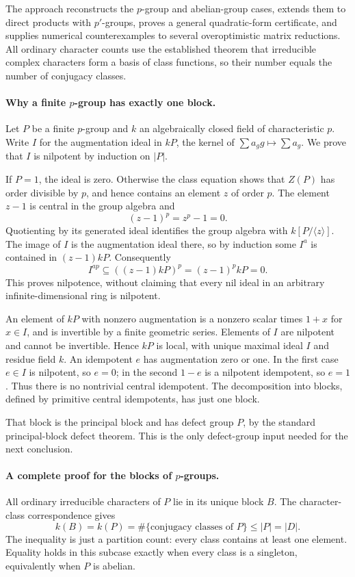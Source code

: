 \documentclass[11pt]{article}
\begin{document}
The approach reconstructs the $p$-group and abelian-group cases,
extends them to direct products with $p'$-groups, proves a general
quadratic-form certificate, and supplies numerical counterexamples to
several overoptimistic matrix reductions. All ordinary character counts
use the established theorem that irreducible complex characters form
a basis of class functions, so their number equals the number of
conjugacy classes.

\paragraph{Why a finite $p$-group has exactly one block.}
Let $P$ be a finite $p$-group and $k$ an algebraically closed field of
characteristic $p$. Write $I$ for the augmentation ideal in $kP$,
the kernel of $\sum a_g g\mapsto\sum a_g$. We prove that $I$ is
nilpotent by induction on $|P|$.

If $P=1$, the ideal is zero. Otherwise the class equation shows that
$Z(P)$ has order divisible by $p$, and hence contains an element $z$
of order $p$. The element $z-1$ is central in the group algebra and
\[
 (z-1)^p=z^p-1=0.
\]
Quotienting by its generated ideal identifies the group algebra with
$k[P/\langle z\rangle]$. The image of $I$ is the augmentation ideal
there, so by induction some $I^a$ is contained in $(z-1)kP$.
Consequently
\[
 I^{ap}\subseteq((z-1)kP)^p=(z-1)^p kP=0.
\]
This proves nilpotence, without claiming that every nil ideal in an
arbitrary infinite-dimensional ring is nilpotent.

An element of $kP$ with nonzero augmentation is a nonzero scalar times
$1+x$ for $x\in I$, and is invertible by a finite geometric series.
Elements of $I$ are nilpotent and cannot be invertible. Hence $kP$ is
local, with unique maximal ideal $I$ and residue field $k$.
An idempotent $e$ has augmentation zero or one. In the first case
$e\in I$ is nilpotent, so $e=0$; in the second $1-e$ is a nilpotent
idempotent, so $e=1$. Thus there is no nontrivial central idempotent.
The decomposition into blocks, defined by primitive central idempotents,
has just one block.

That block is the principal block and has defect group $P$, by the
standard principal-block defect theorem. This is the only defect-group
input needed for the next conclusion.

\paragraph{A complete proof for the blocks of $p$-groups.}
All ordinary irreducible characters of $P$ lie in its unique block $B$.
The character-class correspondence gives
\[
 k(B)=k(P)=\#\{\text{conjugacy classes of }P\}\le |P|=|D|.
 \tag{352.1}
\]
The inequality is just a partition count: every class contains at least
one element. Equality holds in this subcase exactly when every class
is a singleton, equivalently when $P$ is abelian.
\end{document}
